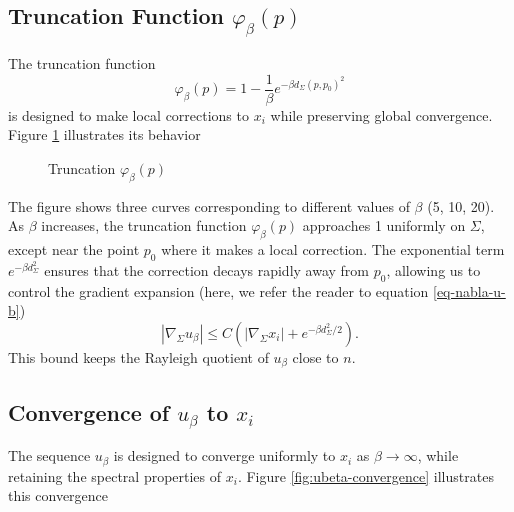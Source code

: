 \documentclass[a4, 12pt]{amsart}
\numberwithin{equation}{section} \numberwithin{equation}{section}
\begin{document}
\subsection{Truncation Function $ \varphi_\beta(p) $}

The truncation function \begin{equation*} \varphi_\beta(p) = 1-\frac{1}{\beta} e^{-\beta d_\Sigma(p, p_0)^2} \end{equation*} is designed to make local corrections to $ x_i $ while preserving global convergence. Figure \ref{fig:phi-beta-decay} illustrates its behavior

\begin{figure}[h!]
    \centering
    \caption{Truncation $ \varphi_\beta(p) $}
    \label{fig:phi-beta-decay}
\end{figure}

The figure shows three curves corresponding to different values of $ \beta $ (5, 10, 20). As $ \beta $ increases, the truncation function $ \varphi_\beta(p) $ approaches 1 uniformly on $ \Sigma $, except near the point $ p_0 $ where it makes a local correction. The exponential term $ e^{-\beta d_\Sigma^2} $ ensures that the correction decays rapidly away from $ p_0 $, allowing us to control the gradient expansion (here, we refer the reader to equation \ref{eq-nabla-u-b})
\begin{equation*}
|\nabla_\Sigma u_\beta| \leq C \left(|\nabla_\Sigma x_i| + e^{-\beta d_\Sigma^2 / 2}\right).
\end{equation*}
This bound keeps the Rayleigh quotient of $ u_\beta $ close to $ n $.

\subsection{Convergence of $ u_\beta $ to $ x_i $}

The sequence $ u_\beta $ is designed to converge uniformly to $ x_i $ as $ \beta \to \infty $, while retaining the spectral properties of $ x_i $. Figure \ref{fig:ubeta-convergence} illustrates this convergence
\end{document}
